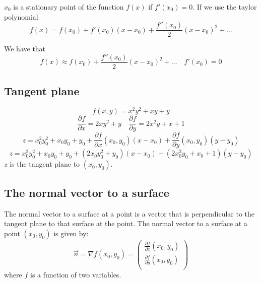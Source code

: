 \pgfplotsset{compat=newest}


$x_0$ is a stationary point of the function $f(x)$ if $f'(x_0) = 0$.
If we use the taylor polynomial
$$f(x) = f(x_0) + f'(x_0)(x-x_0) + \frac{f''(x_0)}{2}(x-x_0)^2 + \ldots$$

We have that
$$f(x) \approx f(x_0) + \frac{f''(x_0)}{2}(x-x_0)^2 + \ldots \quad f'(x_0) = 0 $$

\subsection{Tangent plane}

$$ f(x, y) = x^2y^2 + xy + y $$
$$ \frac{\partial f}{\partial x} = 2xy^2 + y \quad \frac{\partial f}{\partial y} = 2x^2y + x + 1 $$
$$ z = x_0^2y_0^2 + x_0y_0 + y_0 + \frac{\partial f}{\partial x}(x_0, y_0)(x-x_0) + \frac{\partial f}{\partial y}(x_0, y_0)(y-y_0) $$
$$ z = x_0^2y_0^2 + x_0y_0 + y_0 + (2x_0y_0^2 + y_0)(x-x_0) + (2x_0^2y_0 + x_0 + 1)(y-y_0) $$
$z$ is the tangent plane to $(x_0, y_0)$.

\subsection{The normal vector to a surface}
The normal vector to a surface at a point is a vector that is perpendicular to the tangent plane to that surface at the point.
The normal vector to a surface at a point \( (x_0, y_0) \) is given by:
$$ \vec{n} = \nabla f(x_0, y_0) = \begin{pmatrix}
\frac{\partial f}{\partial x}(x_0, y_0) \\
\frac{\partial f}{\partial y}(x_0, y_0) \\
\end{pmatrix} $$
where \( f \) is a function of two variables.


